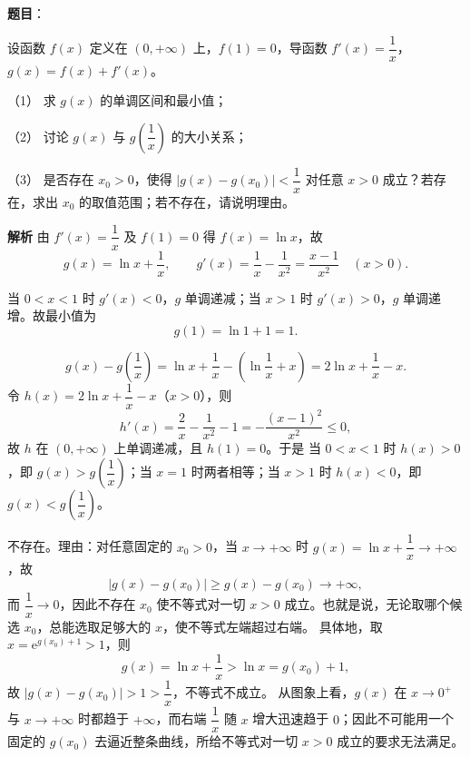 \begin{answer}

\textbf{题目}：

设函数 $f(x)$ 定义在 $(0,+\infty)$ 上，$f(1)=0$，导函数 $f'(x)=\dfrac1x$，$g(x)=f(x)+f'(x)$。

（1） 求 $g(x)$ 的单调区间和最小值；

（2） 讨论 $g(x)$ 与 $g\left(\dfrac1x\right)$ 的大小关系；

（3） 是否存在 $x_0>0$，使得 $|g(x)-g(x_0)|<\dfrac1x$ 对任意 $x>0$ 成立？若存在，求出 $x_0$ 的取值范围；若不存在，请说明理由。

\clearpage

\textbf{解析}
由 $f'(x)=\dfrac1x$ 及 $f(1)=0$ 得 $f(x)=\ln x$，故
\nopagebreak[4]
\[g(x)=\ln x+\frac1x,\qquad g'(x)=\frac1x-\frac1{x^2}=\frac{x-1}{x^2}\quad(x>0).\]

当 $0<x<1$ 时 $g'(x)<0$，$g$ 单调递减；当 $x>1$ 时 $g'(x)>0$，$g$ 单调递增。故最小值为
\nopagebreak[4]
\[g(1)=\ln1+1=1.\]

\nopagebreak[4]
\[g(x)-g\left(\frac1x\right)=\ln x+\frac1x-\left(\ln\frac1x+x\right)=2\ln x+\frac1x-x.\]
令 $h(x)=2\ln x+\dfrac1x-x$（$x>0$），则
\nopagebreak[4]
\[h'(x)=\frac2x-\frac1{x^2}-1=-\frac{(x-1)^2}{x^2}\leqslant0,\]
故 $h$ 在 $(0,+\infty)$ 上单调递减，且 $h(1)=0$。于是
当 $0<x<1$ 时 $h(x)>0$，即 $g(x)>g\left(\dfrac1x\right)$；当 $x=1$ 时两者相等；当 $x>1$ 时 $h(x)<0$，即 $g(x)<g\left(\dfrac1x\right)$。

不存在。理由：对任意固定的 $x_0>0$，当 $x\to+\infty$ 时 $g(x)=\ln x+\dfrac1x\to+\infty$，故
\nopagebreak[4]
\[|g(x)-g(x_0)|\geqslant g(x)-g(x_0)\to+\infty,\]
而 $\dfrac1x\to0$，因此不存在 $x_0$ 使不等式对一切 $x>0$ 成立。也就是说，无论取哪个候选 $x_0$，总能选取足够大的 $x$，使不等式左端超过右端。
具体地，取 $x=\mathrm e^{g(x_0)+1}>1$，则
\nopagebreak[4]
\[g(x)=\ln x+\frac1x>\ln x=g(x_0)+1,\]
故 $|g(x)-g(x_0)|>1>\dfrac1x$，不等式不成立。
从图象上看，$g(x)$ 在 $x\to0^+$ 与 $x\to+\infty$ 时都趋于 $+\infty$，而右端 $\dfrac1x$ 随 $x$ 增大迅速趋于 $0$；因此不可能用一个固定的 $g(x_0)$ 去逼近整条曲线，所给不等式对一切 $x>0$ 成立的要求无法满足。




\end{answer}